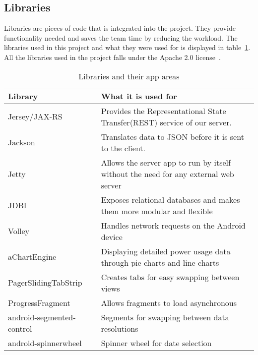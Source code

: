 \subsection{Libraries}
\label{sec:libraries}
Libraries are pieces of code that is integrated into the project. They provide functionality needed and saves the team time by reducing the workload. The libraries used in this project and what they were used for is displayed in table~\ref{tab:libs}.
 All the libraries used in the project falls under the Apache 2.0 license~\cite{apache}.

\begin{table}[H]
\begin{tabular}{|l|p{10.4cm}|}
\hline
\textbf{Library }& \textbf{What it is used for}\\\hline
Jersey/JAX-RS~\cite{jersey} & Provides the Representational State Transfer(REST) service of our server.\\\hline
Jackson~\cite{jackson}&Translates data to \gls{JSON} before it is sent to the client.\\\hline
Jetty~\cite{jetty}&Allows the server app to run by itself without the need for any external web server\\\hline
JDBI~\cite{jdbi}&Exposes relational databases and makes them more modular and flexible\\\hline
Volley~\cite{volley}& Handles network requests on the Android device\\\hline
aChartEngine~\cite{achart}& Displaying detailed power usage data through  pie charts and line charts\\\hline
PagerSlidingTabStrip~\cite{psts}& Creates tabs for easy swapping between views\\\hline
ProgressFragment~\cite{progressfragment}& Allows fragments to load asynchronous\\\hline
android-segmented-control~\cite{segments}& Segments for swapping between data resolutions\\\hline
android-spinnerwheel\cite{spinnerwheel}& Spinner wheel for date selection\\\hline
\end{tabular}
\caption{Libraries and their app areas}
\label{tab:libs}
\end{table}


